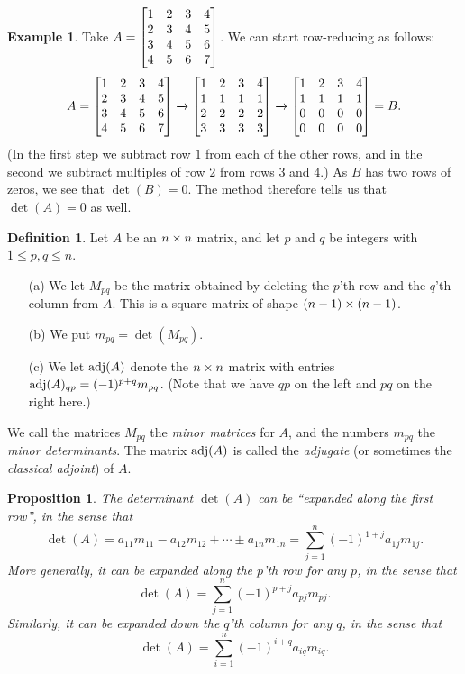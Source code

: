 \documentclass[reqno]{amsart}
\newtheorem{proposition}[theorem]{Proposition}
\theoremstyle{definition}
\newtheorem{definition}[theorem]{Definition}
\newtheorem{example}[theorem]{Example}
\newcommand{\dfn}[1]{\emph{{#1}}\index{#1}}
\begin{document}
\begin{example}\label{eg-det-ro-ii}
 Take $A=\left[\begin{matrix} 1&2&3&4 \\ 2&3&4&5 \\ 3&4&5&6 \\ 4&5&6&7 \end{matrix}\right]$.  We can
 start row-reducing as follows:
 \[ A =
  \left[\begin{matrix} 1&2&3&4 \\
       2&3&4&5 \\
       3&4&5&6 \\
       4&5&6&7 \end{matrix}\right]
  \xrightarrow{}
  \left[\begin{matrix} 1&2&3&4 \\
       1&1&1&1 \\
       2&2&2&2 \\
       3&3&3&3 \end{matrix}\right]
  \xrightarrow{}
  \left[\begin{matrix} 1&2&3&4 \\
       1&1&1&1 \\
       0&0&0&0 \\
       0&0&0&0 \end{matrix}\right]
  = B.
 \]
 (In the first step we subtract row $1$ from each of the other rows,
 and in the second we subtract multiples of row $2$ from rows $3$ and
 $4$.)  As $B$ has two rows of zeros, we see that $\det(B)=0$.  The
 method therefore tells us that $\det(A)=0$ as well.
\end{example}

\begin{definition}\label{defn-minors-pre}
 Let $A$ be an $n\times n$ matrix, and let $p$ and $q$ be integers with
 $1\leq p,q\leq n$.
 \begin{itemize}
  \item[(a)] We let $M_{pq}$ be the matrix obtained by deleting the
   $p$'th row and the $q$'th column from $A$.  This is a square matrix
   of shape $(n-1)\times(n-1)$.
  \item[(b)] We put $m_{pq}=\det(M_{pq})$.
  \item[(c)] We let $\operatorname{adj}(A)$ denote the $n\times n$ matrix with entries
   $\operatorname{adj}(A)_{qp}=(-1)^{p+q}m_{pq}$.  (Note that we have $qp$ on the
   left and $pq$ on the right here.)
 \end{itemize}
 We call the matrices $M_{pq}$ the \emph{minor matrices} for $A$, and
 the numbers $m_{pq}$ the \emph{minor determinants}.  The matrix
 $\operatorname{adj}(A)$ is called the \dfn{adjugate} (or sometimes the
 \dfn{classical adjoint}) of $A$.
\end{definition}

\begin{proposition}\label{prop-det-expand-pre}
 The determinant $\det(A)$ can be ``expanded along the first row'', in
 the sense that
 \[ \det(A) = a_{11}m_{11} - a_{12}m_{12} + \dotsb \pm a_{1n}m_{1n}
            = \sum_{j=1}^n (-1)^{1+j} a_{1j}m_{1j}.
 \]
 More generally, it can be expanded along the $p$'th row for any $p$,
 in the sense that
 \[ \det(A) = \sum_{j=1}^n (-1)^{p+j} a_{pj}m_{pj}. \]
 Similarly, it can be expanded down the $q$'th column for any $q$,
 in the sense that
 \[ \det(A) = \sum_{i=1}^n (-1)^{i+q} a_{iq}m_{iq}. \]
\end{proposition}
\end{document}
